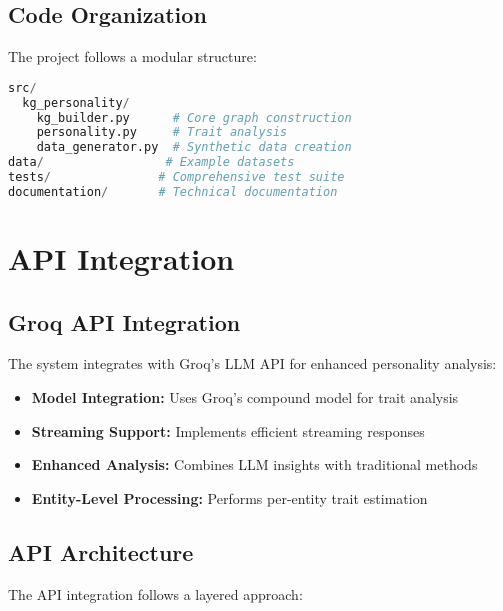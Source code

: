 \documentclass[11pt]{article}
\begin{document}
\subsection{Code Organization}
The project follows a modular structure:

\begin{lstlisting}[language=Python, caption=Project Structure]
src/
  kg_personality/
    kg_builder.py      # Core graph construction
    personality.py     # Trait analysis
    data_generator.py  # Synthetic data creation
data/                 # Example datasets
tests/               # Comprehensive test suite
documentation/       # Technical documentation
\end{lstlisting}

\section{API Integration}

\subsection{Groq API Integration}
The system integrates with Groq's LLM API for enhanced personality analysis:

\begin{itemize}[label=$\bullet$]
    \item \textbf{Model Integration:} Uses Groq's compound model for trait analysis
    \item \textbf{Streaming Support:} Implements efficient streaming responses
    \item \textbf{Enhanced Analysis:} Combines LLM insights with traditional methods
    \item \textbf{Entity-Level Processing:} Performs per-entity trait estimation
\end{itemize}

\subsection{API Architecture}
The API integration follows a layered approach:
\end{document}
